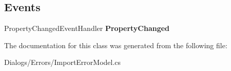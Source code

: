 \subsection*{Events}
\begin{DoxyCompactItemize}
\item 
\mbox{\label{class_a_f_h___scheduler_1_1_dialogs_1_1_errors_1_1_import_error_model_a5ee17fbad776835a17bdfb1b4108e09d}} 
Property\+Changed\+Event\+Handler {\bfseries Property\+Changed}
\end{DoxyCompactItemize}


The documentation for this class was generated from the following file\+:\begin{DoxyCompactItemize}
\item 
Dialogs/\+Errors/Import\+Error\+Model.\+cs\end{DoxyCompactItemize}
